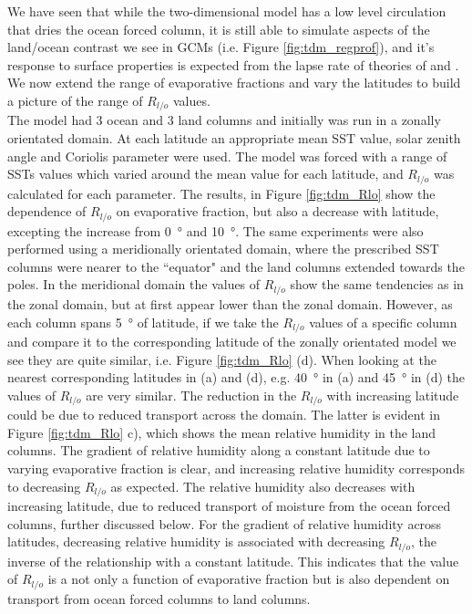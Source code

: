 We have seen that while the two-dimensional model has a low level circulation 
that dries the ocean forced column, it is still able to simulate aspects of the 
land/ocean contrast we see in GCMs (i.e. Figure \ref{fig:tdm_regprof}), and it's 
response to surface properties is expected from the lapse rate of theories of 
\cite{Joshi2007} and \cite{Byrne2013a}. We now extend the range of evaporative 
fractions and vary the latitudes to build a picture of the range of $R_{l/o}$ 
values.\\
The model had 3 ocean and 3 land columns and initially was run in a zonally 
orientated domain. At each latitude an appropriate mean SST value, solar zenith 
angle and Coriolis parameter were used.  The model was forced with a range of 
SSTs values which varied around the mean value for each latitude, and $R_{l/o}$ 
was calculated for each parameter.	The results, in Figure \ref{fig:tdm_Rlo} 
show the dependence of $R_{l/o}$ on evaporative fraction, but also a decrease 
with latitude, excepting the increase from \SI{0}{\degree} and \SI{10}{\degree}.  
The same experiments were also performed using a meridionally orientated domain, 
where the prescribed SST columns were nearer to the ``equator" and the land 
columns extended towards the poles.  In the meridional domain the values of 
$R_{l/o}$ show the same tendencies as in the zonal domain, but at first appear 
lower than the zonal domain. However, as each column spans \SI{5}{\degree} of 
latitude, if we take the $R_{l/o}$ values of a specific column and compare it to 
the corresponding latitude of the zonally orientated model we see they are quite 
similar, i.e. Figure \ref{fig:tdm_Rlo} (d). When looking at the nearest 
corresponding latitudes in (a) and (d), e.g. \SI{40}{\degree} in (a) and 
\SI{45}{\degree} in (d) the values of $R_{l/o}$ are very similar.  The reduction 
in the $R_{l/o}$ with increasing latitude could be due to reduced transport 
across the domain. The latter is evident in Figure \ref{fig:tdm_Rlo} c), which 
shows the mean relative humidity in the land columns. The gradient of relative 
humidity along a constant latitude due to varying evaporative fraction is clear, 
and increasing relative humidity corresponds to decreasing $R_{l/o}$ as 
expected.  The relative humidity also decreases with increasing latitude, due to 
reduced transport of moisture from the ocean forced columns, further discussed 
below.  For the gradient of relative humidity across latitudes, decreasing 
relative humidity is associated with decreasing $R_{l/o}$, the inverse of the 
relationship with a constant latitude.  This indicates that the value of 
$R_{l/o}$ is a not only a function of evaporative fraction but is also dependent 
on transport from ocean forced columns to land columns.\\

